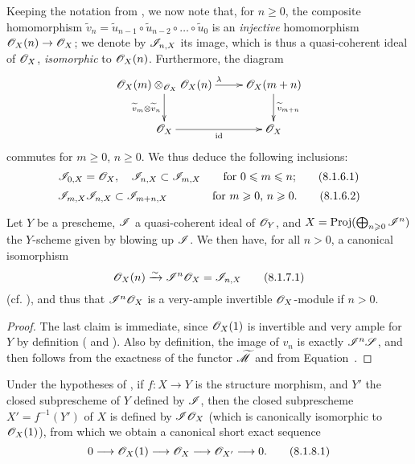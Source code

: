 \begin{env}[8.1.6]
\label{II.8.1.6}
Keeping the notation from , we now note that, for $n\geq0$, the composite homomorphism $\widetilde{v}_n = \widetilde{u}_{n-1} \circ \widetilde{u}_{n-2} \circ \ldots \circ \widetilde{u}_0$ is an \emph{injective} homomorphism $\sh{O}_X(n) \to \sh{O}_X$;
we denote by $\mathscr{I}_{n,X}$ its image, which is thus a quasi-coherent ideal of $\mathscr{O}_X$, \emph{isomorphic} to $\mathscr{O}_X(n)$.
Furthermore, the diagram
\[
  \xymatrix{
    \sh{O}_X(m) \otimes_{\sh{O}_X} \sh{O}_X(n)
      \ar[r]^{\lambda}
      \ar[d]_{\widetilde{v}_m \otimes \widetilde{v}_n}
  & \sh{O}_X(m+n)
      \ar[d]^{\widetilde{v}_{m+n}}
  \\\sh{O}_X
      \ar[r]_{\id}
  & \sh{O}_X
  }
\]
commutes for $m\geq0$, $n\geq0$.
We thus deduce the following inclusions:
\[
\label{II.8.1.6.1}
  \mathscr{I}_{0,X} = \mathscr{O}_X, \quad \mathscr{I}_{n,X} \subset \mathscr{I}_{m,X}
  \qquad\mbox{for $0\leqslant m\leqslant n$;}
\tag{8.1.6.1}
\]
\[
\label{II.8.1.6.2}
  \mathscr{I}_{m,X}\mathscr{I}_{n,X} \subset \mathscr{I}_{m+n,X}
  \qquad\qquad\mbox{for $m\geqslant0$, $n\geqslant0$.}
\tag{8.1.6.2}
\]
\end{env}


\begin{proposition}[8.1.7]
\label{II.8.1.7}
Let $Y$ be a prescheme, $\mathscr{I}$ a quasi-coherent ideal of $\mathscr{O}_Y$, and $X = \operatorname{Proj}(\bigoplus_{n\geqslant0}\mathscr{I}^n)$ the $Y$-scheme given by blowing up $\mathscr{I}$.
We then have, for all $n>0$, a canonical isomorphism
\[
\label{II.8.1.7.1}
  \mathscr{O}_X(n) \xrightarrow{\sim} \mathscr{I}^n\mathscr{O}_X = \mathscr{I}_{n,X}
\tag{8.1.7.1}
\]
(cf. ), and thus that $\mathscr{I}^n\mathscr{O}_X$ is a very-ample invertible $\mathscr{O}_X$-module if $n>0$.
\end{proposition}

\begin{proof}
The last claim is immediate, since $\mathscr{O}_X(1)$ is invertible  and very ample for $Y$ by definition ( and ).
Also by definition, the image of $v_n$ is exactly $\mathscr{I}^n\mathscr{S}$, and  then follows from the exactness of the functor $\widetilde{\mathscr{M}}$  and from Equation~.
\end{proof}

\begin{corollary}[8.1.8]
\label{II.8.1.8}
Under the hypotheses of , if $f:X\to Y$ is the structure morphism, and $Y'$ the closed subprescheme of $Y$ defined by $\mathscr{I}$, then the closed subprescheme $X' = f^{-1}(Y')$ of $X$ is defined by $\mathscr{I}\mathscr{O}_X$ (which is canonically isomorphic to $\mathscr{O}_X(1)$), from which we obtain a canonical short exact sequence
\[
\label{II.8.1.8.1}
  0 \to \sh{O}_X(1) \to \sh{O}_X \to \sh{O}_{X'} \to 0.
\tag{8.1.8.1}
\]
\end{corollary}

